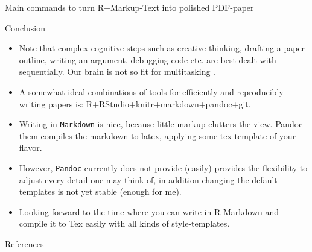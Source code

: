 \documentclass[final,hyperref={pdfpagelabels=false}]{beamer}
\begin{document}
\begin{frame}{}
\begin{columns}[t]
\begin{column}{.48\linewidth}
\begin{block}{Main commands to turn R+Markup-Text into polished PDF-paper}
        \end{block}
        
        
        
        \begin{block}{Conclusion}
            \begin{itemize}
            \item Note that complex cognitive steps such as creative thinking, drafting a paper outline, writing an argument, debugging code etc. are best dealt with sequentially. Our brain is not so fit for multitasking \cite{Clapp2011}.
             \item A somewhat ideal combinations of tools for efficiently and reproducibly writing papers is: R+RStudio+knitr+markdown+pandoc+git.    
             \item Writing in \texttt{Markdown} is nice, because little markup clutters the view. Pandoc them compiles the markdown to latex, applying some tex-template of your flavor.
             \item However,  \texttt{Pandoc} currently does not provide (easily) provides the flexibility to adjust every detail one may think of, in addition changing the default templates is not yet stable (enough for me). 
             \item Looking forward to the time where you can write in R-Markdown and compile it to Tex easily with all kinds of style-templates.
                \end{itemize}
        \end{block}     



     \begin{block}{References}
     \begin{tiny}
     
     
     \end{tiny}
        \end{block}     
   
   
         \end{column}
    \end{columns}
  \end{frame}
\end{document}
